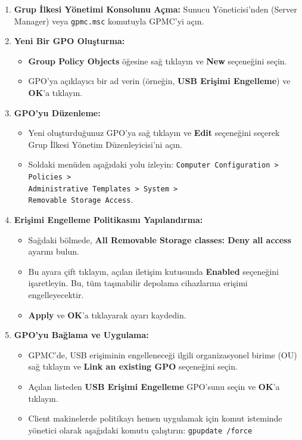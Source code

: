 \begin{enumerate}
    \item \textbf{Grup İlkesi Yönetimi Konsolunu Açma:} Sunucu Yöneticisi'nden (Server Manager) veya \texttt{gpmc.msc} komutuyla GPMC'yi açın.
    \item \textbf{Yeni Bir GPO Oluşturma:}
    \begin{itemize}
        \item \textbf{Group Policy Objects} öğesine sağ tıklayın ve \textbf{New} seçeneğini seçin.
        \item GPO'ya açıklayıcı bir ad verin (örneğin, \textbf{USB Erişimi Engelleme}) ve \textbf{OK}'a tıklayın.
    \end{itemize}
    \item \textbf{GPO'yu Düzenleme:}
    \begin{itemize}
        \item Yeni oluşturduğunuz GPO'ya sağ tıklayın ve \textbf{Edit} seçeneğini seçerek Grup İlkesi Yönetim Düzenleyicisi'ni açın.
        \item Soldaki menüden aşağıdaki yolu izleyin: \texttt{Computer Configuration > Policies > \\ Administrative Templates > System > \\ Removable Storage Access}.
    \end{itemize}
    \item \textbf{Erişimi Engelleme Politikasını Yapılandırma:}
    \begin{itemize}
        \item Sağdaki bölmede, \textbf{All Removable Storage classes: Deny all access} ayarını bulun.
        \item Bu ayara çift tıklayın, açılan iletişim kutusunda \textbf{Enabled} seçeneğini işaretleyin. Bu, tüm taşınabilir depolama cihazlarına erişimi engelleyecektir.
        \item \textbf{Apply} ve \textbf{OK}'a tıklayarak ayarı kaydedin.
    \end{itemize}
    \item \textbf{GPO'yu Bağlama ve Uygulama:}
    \begin{itemize}
        \item GPMC'de, USB erişiminin engelleneceği ilgili organizasyonel birime (OU) sağ tıklayın ve \textbf{Link an existing GPO} seçeneğini seçin.
        \item Açılan listeden \textbf{USB Erişimi Engelleme} GPO'sunu seçin ve \textbf{OK}'a tıklayın.
        \item Client makinelerde politikayı hemen uygulamak için komut isteminde yönetici olarak aşağıdaki komutu çalıştırın: \texttt{gpupdate /force}
    \end{itemize}
\end{enumerate}

